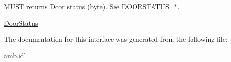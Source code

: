 M\-U\-S\-T returns Door status (byte). See D\-O\-O\-R\-S\-T\-A\-T\-U\-S\-\_\-$\ast$. 

\hyperlink{interfaceVehicle_1_1org_1_1automotive_1_1DoorStatus}{Door\-Status} 

The documentation for this interface was generated from the following file\-:\begin{DoxyCompactItemize}
\item 
amb.\-idl\end{DoxyCompactItemize}

